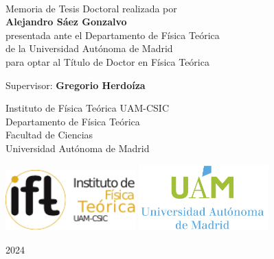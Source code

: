 \begin{titlepage}
    \begin{addmargin}[-1cm]{-3cm}
    \begin{center}
        \large

        \hfill

        \vfill

        \begingroup
            \color{CTtitle} \\ \bigskip
        \endgroup
        
        \vfill

        Memoria de Tesis Doctoral realizada por \\ \bigskip
        \textbf{Alejandro S\'aez Gonzalvo} \\ \bigskip
        presentada ante el Departamento de F\'isica Te\'orica \\
		de la Universidad Aut\'onoma de Madrid \\
        para optar al T\'itulo de Doctor en F\'isica Te\'orica

        \vfill

        Supervisor: \textbf{Gregorio Herdo\'iza}
        
        \bigskip
        
        Instituto de F\'isica Te\'orica UAM-CSIC \\
        Departamento de F\'isica Te\'orica \\
        Facultad de Ciencias \\
        Universidad Aut\'onoma de Madrid 
        
        \vfill
        
        \includegraphics[width=5cm]{gfx/LogoIFT.pdf} \hfill
        \includegraphics[width=5cm]{gfx/LogoUAMVertical.png} \\ 
        
        \vfill

        2024

        \vfill

    \end{center}
  \end{addmargin}
\end{titlepage}
